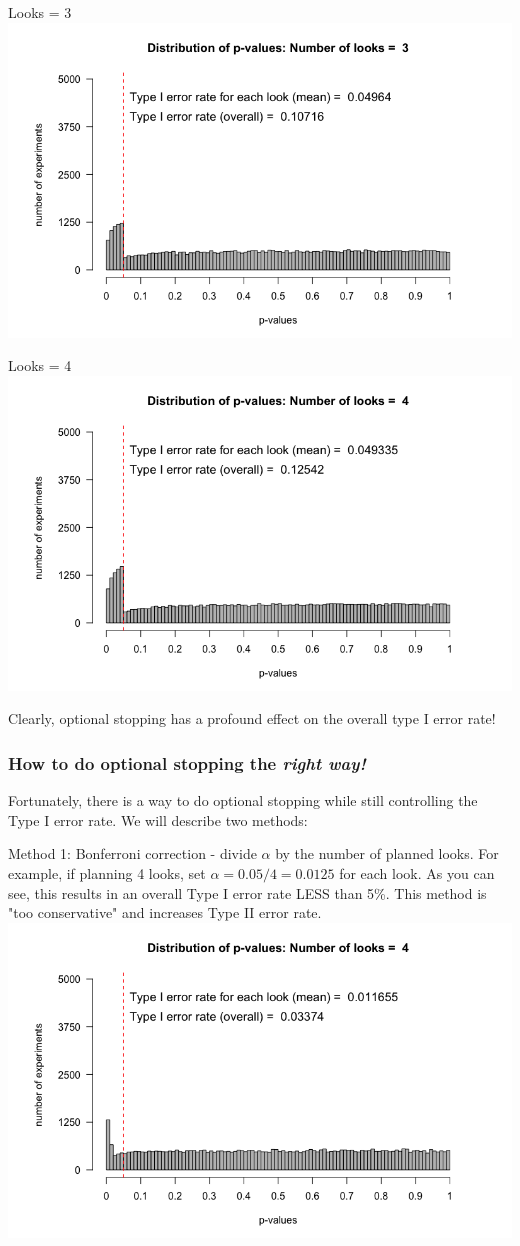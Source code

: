 \documentclass[11pt]{article}
\begin{document}
Looks = 3
\includegraphics[width=.9\linewidth]{figures/looks-3.png}

Looks = 4
\includegraphics[width=.9\linewidth]{figures/looks-4.png}


Clearly, optional stopping has a profound effect on the overall type I error rate!

\subsubsection*{How to do optional stopping the \emph{right way!}}
\label{sec-1-0-4}
Fortunately, there is a way to do optional stopping while still controlling the Type I error rate.  We will describe two methods:

Method 1: Bonferroni correction - divide $\alpha$ by the number of planned looks.  For example, if planning 4 looks, set $\alpha=0.05/4=0.0125$ for each look. As you can see, this results in an overall Type I error rate LESS than 5\%.  This method is "too conservative" and increases Type II error rate.
\includegraphics[width=.9\linewidth]{figures/bonferroniCorrection.png}
\end{document}
